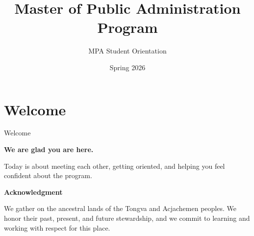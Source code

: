 \documentclass[10pt]{beamer}
\title{Master of Public Administration Program}
\subtitle{MPA Student Orientation}
\date{Spring 2026}
\begin{document}

\maketitle

\section{\textcolor{titanorange}{Welcome}}
\begin{frame}{Welcome}
\begin{Large}
  \textbf{We are glad you are here.}\par\vspace{0.5em}
  Today is about meeting each other, getting oriented, and helping you feel confident about the program.\par\vspace{0.75em}

  \textbf{Acknowledgment}\par
  We gather on the ancestral lands of the Tongva and Acjachemen peoples. We honor their past, present, and future stewardship, and we commit to learning and working with respect for this place.
\end{Large}
\end{frame}
\end{document}
